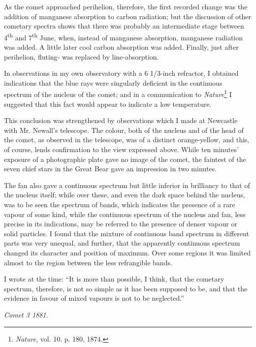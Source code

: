 \documentclass[a4paper, 12pt, oneside, polutonikogreek, english]{article}
\begin{document}
As the comet approached perihelion, therefore, the first recorded change was the addition of manganese absorption to carbon radiation; but the discussion of other cometary spectra shows that there was probably an intermediate stage between 4\textsuperscript{th} and 7\textsuperscript{th} June, when, instead of manganese absorption, manganese radiation was added. A little later cool carbon absorption was added. Finally, just after perihelion, fluting- was replaced by line-absorption.

In observations in my own observatory with a 6 1/3-inch refractor, I obtained indications that the blue rays were singularly deficient in the continuous spectrum of the nucleus of the comet; and in a communication to \emph{Nature}\footnote{\emph{Nature}, vol. 10. p. 180, 1874.} I suggested that this fact would appear to indicate a low temperature.

This conclusion was strengthened by observations which I made at Newcastle with Mr. Newall's telescope. The colour, both of the nucleus and of the head of the comet, as observed in the telescope, was of a distinct orange-yellow, and this, of course, lends confirmation to the view expressed above. While ten minutes' exposure of a photographic plate gave no image of the comet, the faintest of the seven chief stars in the Great Bear gave an impression in two minutes.

The fan also gave a continuous spectrum but little inferior in brilliancy to that of the nucleus itself; while over these, and even the dark space behind the nucleus, was to be seen the spectrum of bands, which indicates the presence of a rare vapour of some kind, while the continuous spectrum of the nucleus and fan, less precise in its indications, may be referred to the presence of denser vapour or solid particles. I found that the mixture of continuous band spectrum in different parts was very unequal, and further, that the apparently continuous spectrum changed its character and position of maximum. Over some regions it was limited almost to the region between the less refrangible bands.

I wrote at the time: ``It is more than possible, I think, that the cometary spectrum, therefore, is not so simple as it has been supposed to be, and that the evidence in favour of mixed vapours is not to be neglected.''

\emph{Comet 3 1881.}
\end{document}
